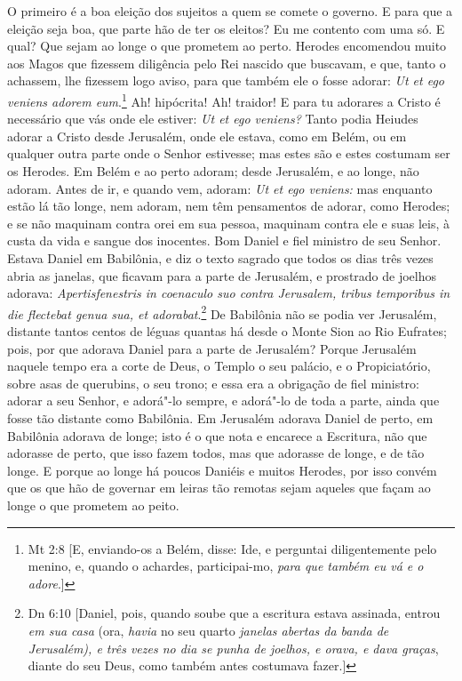 O primeiro é a boa eleição dos sujeitos a quem se comete o governo. E
para que a eleição seja boa, que parte hão de ter os eleitos? Eu me
contento com uma só. E qual? Que sejam ao longe o que prometem ao perto.
Herodes encomendou muito aos Magos que fizessem diligência pelo Rei
nascido que buscavam, e que, tanto o achassem, lhe fizessem logo aviso,
para que também ele o fosse adorar: \emph{Ut et ego veniens adorem eum}.\footnote{Mt 2:8 [E, enviando-os a Belém, disse: Ide, e perguntai diligentemente pelo menino, e, quando o
achardes, participai-mo, \emph{para que também eu vá e o adore}.]}
Ah! hipócrita! Ah! traidor! E para tu adorares a Cristo é
necessário que vás onde ele estiver: \emph{Ut et ego veniens?} Tanto
podia Heiudes adorar a Cristo desde Jerusalém, onde ele estava, como em
Belém, ou em qualquer outra parte onde o Senhor estivesse; mas estes são
e estes costumam ser os Herodes. Em Belém e ao perto adoram; desde
Jerusalém, e ao longe, não adoram. Antes de ir, e quando vem, adoram:
\emph{Ut et ego veniens:} mas enquanto estão lá tão longe, nem
adoram, nem têm pensamentos de adorar, como Herodes; e se não maquinam
contra orei em sua pessoa, maquinam contra ele e suas leis, à custa da
vida e sangue dos inocentes. Bom Daniel e fiel ministro de seu Senhor.
Estava Daniel em Babilônia, e diz o texto sagrado que todos os dias três
vezes abria as janelas, que ficavam para a parte de Jerusalém, e
prostrado de joelhos adorava: \emph{Apertisfenestris in coenaculo suo
contra Jerusalem, tribus temporibus in die flectebat genua sua, et
adorabat}.\footnote{Dn 6:10 [Daniel, pois, quando soube que a escritura estava assinada, entrou \emph{em sua casa} (ora, \emph{havia} no seu quarto \emph{janelas abertas da banda de Jerusalém), e três vezes no dia se punha de joelhos, e orava, e dava graças}, diante do seu Deus, como também antes costumava fazer.]} De Babilônia não se podia ver Jerusalém,
distante tantos centos de léguas quantas há desde o Monte Sion ao Rio
Eufrates; pois, por que adorava Daniel para a parte de Jerusalém? Porque
Jerusalém naquele tempo era a corte de Deus, o Templo o seu palácio, e o
Propiciatório, sobre asas de querubins, o seu trono; e essa era a
obrigação de fiel ministro: adorar a
seu Senhor, e adorá"-lo sempre, e adorá"-lo de toda a parte, ainda que
fosse tão distante como Babilônia. Em Jerusalém adorava Daniel de perto,
em Babilônia adorava de longe; isto é o que nota e encarece a Escritura,
não que adorasse de perto, que isso fazem todos, mas que adorasse de
longe, e de tão longe. E porque ao longe há poucos Daniéis e muitos
Herodes, por isso convém que os que hão de governar em leiras tão
remotas sejam aqueles que façam ao longe o que prometem ao peito.

